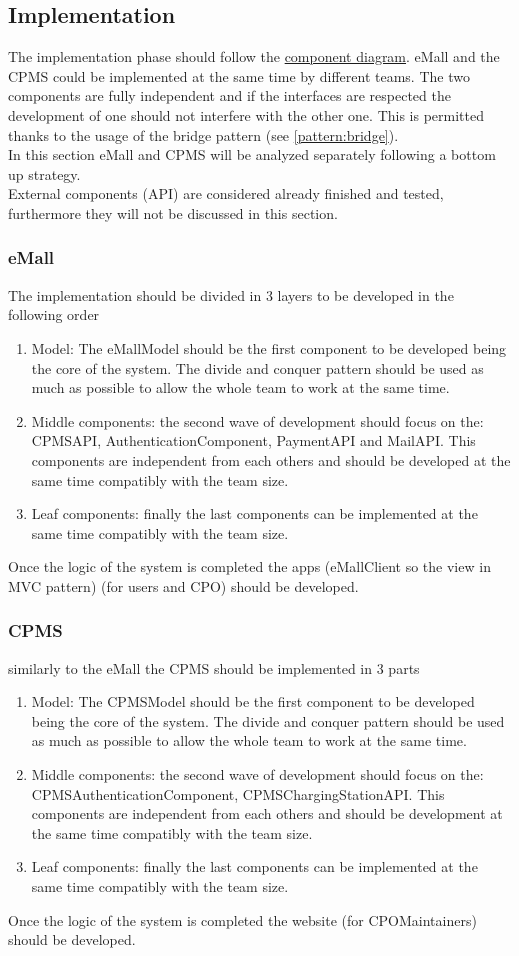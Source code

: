 \subsection{Implementation}
The implementation phase should follow the \hyperref[fig:eMSP-component]{component diagram}. \ac{eMall} and the \ac{CPMS} could be implemented at the same time by different teams. The two components are fully independent and if the interfaces are respected the development of one should not interfere with the other one. This is permitted thanks to the usage of the bridge pattern (see \autoref{pattern:bridge}).\\
In this section \ac{eMall} and \ac{CPMS} will be analyzed separately following a bottom up strategy.\\
External components (\ac{API}) are considered already finished and tested, furthermore they will not be discussed in this section.
\subsubsection{eMall}
The implementation should be divided in 3 layers to be developed in the following order
\begin{enumerate}
    \item Model: The eMallModel should be the first component to be developed being the core of the system. The divide and conquer pattern should be used as much as possible to allow the whole team to work at the same time.
    \item Middle components: the second wave of development should focus on the: \ac{CPMS}\ac{API}, AuthenticationComponent, Payment\ac{API} and Mail\ac{API}. This components are independent from each others and should be developed at the same time compatibly with the team size.
    \item Leaf components: finally the last components can be implemented at the same time compatibly with the team size.
\end{enumerate}
Once the logic of the system is completed the apps (eMallClient so the view in \ac{MVC} pattern) (for users and \ac{CPO}) should be developed.
\subsubsection{CPMS}
similarly to the \ac{eMall} the \ac{CPMS} should be implemented in 3 parts
\begin{enumerate}
    \item Model: The CPMSModel should be the first component to be developed being the core of the system. The divide and conquer pattern should be used as much as possible to allow the whole team to work at the same time.
    \item Middle components: the second wave of development should focus on the: CPMSAuthenticationComponent, CPMSChargingStation\ac{API}. This components are independent from each others and should be development at the same time compatibly with the team size.
    \item Leaf components: finally the last components can be implemented at the same time compatibly with the team size.
\end{enumerate}
Once the logic of the system is completed the website (for \ac{CPO}Maintainers) should be developed.
